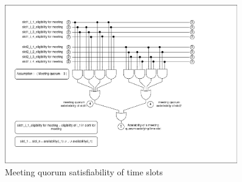 \documentclass{article}
\begin{document}
\begin{figure}[H]
    \centering
    \includegraphics[width=0.9\textwidth]{./image/circuit_diagram/3_quorum_satisfying_slot_selection.png}
    \caption{Meeting quorum satisfiability of time slots}
    \label{fig:meeting quorum satisfiability of time slots}
\end{figure} 

\end{document}
